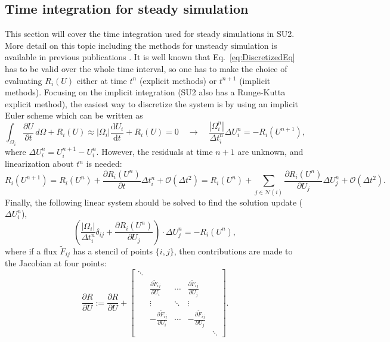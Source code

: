 \subsection*{Time integration for steady simulation}
This section will cover the time integration used for steady simulations in SU2. More detail on this topic including the methods for unsteady simulation is available in previous publications \cite{palacios2013,Palacios:2014,PalaciosEconomon:2014 }. It is well known that Eq.~\ref{eq:DiscretizedEq} has to be valid over the whole time interval, so one has to make the choice of evaluating $R_i(U)$ either at time $t^{n}$ (explicit methods) or $t^{n+1}$ (implicit methods). Focusing on the implicit integration (SU2 also has a Runge-Kutta explicit method), the easiest way to discretize the system is by using an implicit Euler scheme which can be written as
\begin{equation}
\int_{\Omega_i}{\frac{\partial{U}}{\partial{t}}}\,d\Omega + R_i(U) \approx |\Omega_i| \frac{\mathrm{d}U_i}{\mathrm{d}t} + R_i(U) = 0 \quad \rightarrow \quad \frac{|\Omega_i^n|}{\Delta t_i^n} \Delta U_i^n = - R_i(U^{n+1}),
\label{eq:Implicit_Euler}
\end{equation}
where $\Delta U_i^n = U_i^{n+1} - U_i^n$. However, the residuals at time $n+1$ are unknown, and linearization about $t^n$ is needed:
\begin{equation}
R_i(U^{n+1})  =  R_i(U^n) + \frac{\partial R_i (U^n)}{\partial t} \Delta t_i^n + \mathcal{O}(\Delta t^2) = R_i(U^n) + \sum_{j \in \mathcal{N}(i)} \frac{\partial R_i (U^n)}{\partial U_j} \Delta U_j^n + \mathcal{O}(\Delta t^2).
\end{equation}
Finally, the following linear system should be solved to find the solution update ($\Delta U_i^n$),
\begin{equation}\label{linear_system}
\left( \frac{|\Omega_i|}{\Delta t_i^n} \delta_{ij} + \frac{\partial R_i (U^n)}{\partial U_j} \right) \cdot \Delta U_j^n = -R_i(U^n),
\end{equation}
where if a flux $\tilde F_{ij}$ has a stencil of points $\{i, j\}$, then contributions are made to the Jacobian at four points:
\begin{equation}
\frac{\partial R}{\partial U} := \frac{\partial R}{\partial U} + \left[
\begin{array}{ccccc}
\ddots & & & & \\
 & \frac{\partial \tilde{F}_{ij}}{\partial U_i} & \cdots & \frac{\partial \tilde{F}_{ij}}{\partial U_j} & \\
 & \vdots & \ddots & \vdots & \\
 & -\frac{\partial \tilde{F}_{ij}}{\partial U_i} & \cdots & -\frac{\partial \tilde{F}_{ij}}{\partial U_j} & \\
 & & & & \ddots 
\end{array}
\right].
\end{equation}

